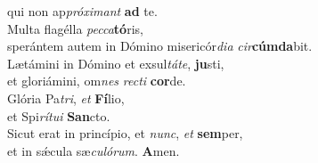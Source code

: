 \evenverse qui non ap\textit{pró}\textit{xi}\textit{mant} \textbf{ad} te.\\
\oddverse Multa flagélla \textit{pec}\textit{ca}\textbf{tó}ris,~\*\\
\oddverse sperántem autem in Dómino misericór\textit{di}\textit{a} \textit{cir}\textbf{cúm}\textbf{da}bit.\\
\evenverse Lætámini in Dómino et exsul\textit{tá}\textit{te}, \textbf{ju}sti,~\*\\
\evenverse et gloriámini, om\textit{nes} \textit{re}\textit{cti} \textbf{cor}de.\\
\oddverse Glória Pa\textit{tri}, \textit{et} \textbf{Fí}lio,~\*\\
\oddverse et Spi\textit{rí}\textit{tu}\textit{i} \textbf{San}cto.\\
\evenverse Sicut erat in princípio, et \textit{nunc}, \textit{et} \textbf{sem}per,~\*\\
\evenverse et in sǽcula sæ\textit{cu}\textit{ló}\textit{rum}. \textbf{A}men.\\

